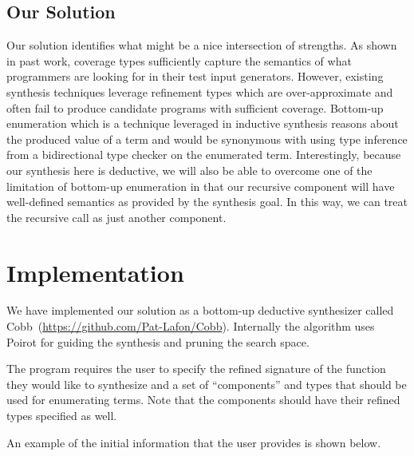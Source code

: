 \documentclass[review, sigplan]{acmart}
\begin{document}
\subsection{Our Solution}
Our solution identifies what might be a nice intersection of strengths. As shown
in past work, coverage types sufficiently capture the semantics of what
programmers are looking for in their test input generators. However, existing
synthesis techniques leverage refinement types which are over-approximate and
often fail to produce candidate programs with sufficient coverage. Bottom-up
enumeration which is a technique leveraged in inductive synthesis reasons about
the produced value of a term and would be synonymous with using type inference
from a bidirectional type checker on the enumerated term. Interestingly, because
our synthesis here is deductive, we will also be able to overcome one of the
limitation of bottom-up enumeration in that our recursive component will have
well-defined semantics as provided by the synthesis goal. In this way, we can
treat the recursive call as just another component.

\section{Implementation}
We have implemented our solution as a bottom-up deductive synthesizer called
Cobb~(\url{https://github.com/Pat-Lafon/Cobb}).
Internally the algorithm uses Poirot for guiding the synthesis and pruning
the search space.

The program requires the user to specify the refined signature of the function
they would like to synthesize and a set of ``components'' and types
that should be used for enumerating terms.
Note that the components should have their refined types specified as
well.

An example of the initial information that the user provides
is shown below.
\end{document}
